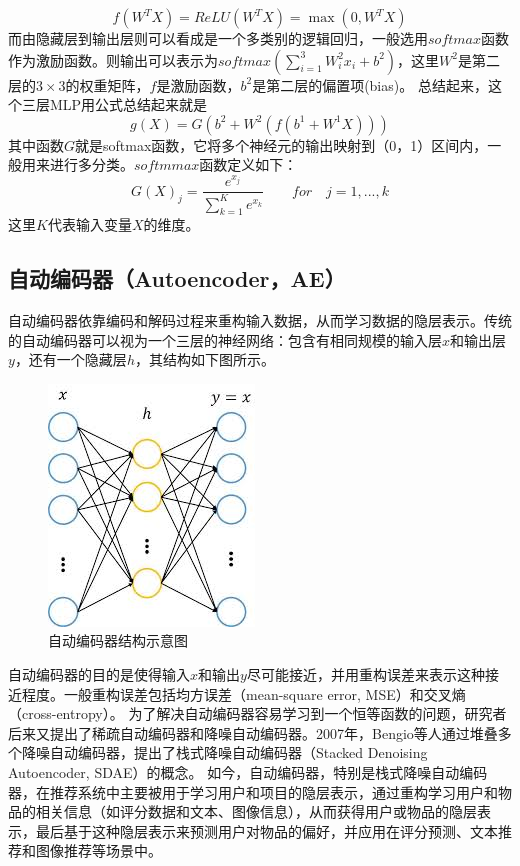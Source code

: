 \begin{equation}
f(W^TX) = ReLU(W^TX) = \max(0,W^TX)
\end{equation}
而由隐藏层到输出层则可以看成是一个多类别的逻辑回归，一般选用$softmax$函数作为激励函数。则输出可以表示为$softmax(\sum\nolimits_{i=1}^{3}W^{2}_{i}x_{i} + b^{2})$，这里$W^{2}$是第二层的$3 \times 3$的权重矩阵，$f$是激励函数，$b^{2}$是第二层的偏置项(bias)。
总结起来，这个三层MLP用公式总结起来就是
\begin{equation}
g(X) = G(b^{2} + W^{2}(f(b^{1} + W^{1}X)))
\end{equation}
其中函数$G$就是softmax函数，它将多个神经元的输出映射到（0，1）区间内，一般用来进行多分类。$softmmax$函数定义如下：
\begin{equation}
G(X)_j = \frac{e^{x_j}}{\sum\nolimits_{k=1}^{K}e^{x_k}}	\qquad  for \quad j = 1,...,k
\end{equation}
这里$K$代表输入变量$X$的维度。
\subsection{自动编码器（Autoencoder，AE）}
自动编码器依靠编码和解码过程来重构输入数据，从而学习数据的隐层表示。传统的自动编码器可以视为一个三层的神经网络：包含有相同规模的输入层$x$和输出层$y$，还有一个隐藏层$h$，其结构如下图所示。

\begin{figure}[htbp]
\centering
\includegraphics[width=0.22\linewidth]{images/AE.jpg}
\caption{自动编码器结构示意图}
\label{fig:fig2}
\end{figure}

自动编码器的目的是使得输入$x$和输出$y$尽可能接近，并用重构误差来表示这种接近程度。一般重构误差包括均方误差（mean-square error, MSE）和交叉熵（cross-entropy）。
为了解决自动编码器容易学习到一个恒等函数的问题，研究者后来又提出了稀疏自动编码器和降噪自动编码器。2007年，Bengio等人\cite{VincentLBM08Bengio}通过堆叠多个降噪自动编码器，提出了栈式降噪自动编码器（Stacked Denoising Autoencoder, SDAE）的概念。
如今，自动编码器，特别是栈式降噪自动编码器，在推荐系统中主要被用于学习用户和项目的隐层表示，通过重构学习用户和物品的相关信息（如评分数据和文本、图像信息），从而获得用户或物品的隐层表示，最后基于这种隐层表示来预测用户对物品的偏好，并应用在评分预测、文本推荐和图像推荐等场景中\cite{WangSY15SDAE}。
